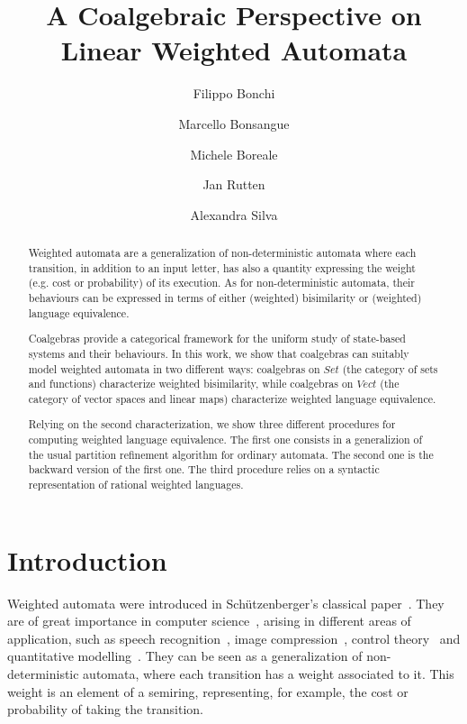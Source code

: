 \documentclass[3p]{elsarticle}
\title{A Coalgebraic Perspective on Linear Weighted Automata}%
\author[ens]{Filippo Bonchi\corref{cor1}}%
\author[liacs,cwi]{Marcello Bonsangue}%
\author[dsif]{Michele Boreale}%
\author[cwi,nej]{Jan Rutten}%
\author[cwi]{Alexandra Silva}%
\begin{document}
\begin{abstract}
Weighted automata are a generalization of non-deterministic automata where each transition,
in addition to an input letter, has also a quantity expressing the weight (e.g. cost or probability)
of its execution. As for non-deterministic automata, their behaviours can be expressed in terms
of either (weighted) bisimilarity or (weighted) language equivalence.

Coalgebras provide a categorical framework for the uniform study of state-based systems and
their behaviours. In this work, we show that coalgebras can suitably model weighted automata in
two different ways: coalgebras on $Set$ (the category of sets and functions) characterize
weighted bisimilarity, while coalgebras on $Vect$ (the category of vector spaces and linear
maps) characterize weighted language equivalence.

Relying on the second characterization, we show three different procedures for computing
weighted language equivalence. The first one consists in a generalizion of the usual partition
refinement algorithm for ordinary automata. The second one is the backward version of the
first one. The third procedure relies on a syntactic representation of rational weighted
languages.

\end{abstract}

\maketitle




\section{Introduction}

Weighted automata were introduced in Sch\"utzenberger's classical
paper~\cite{Schutzenberger61b}. They are of great importance in
computer science~\cite{wahandbook}, arising in different areas of application, such as
speech recognition~\cite{Moh97}, image compression~\cite{image-comp}, control
theory~\cite{isidori} and quantitative modelling~\cite{LarsenS91,qt-hb}.
%
%
%
They can be seen as a generalization of non-deterministic
automata, where each transition has a weight associated to it.
This weight is an element of a semiring, representing, for example,
the cost or probability of taking the transition.
\end{document}
